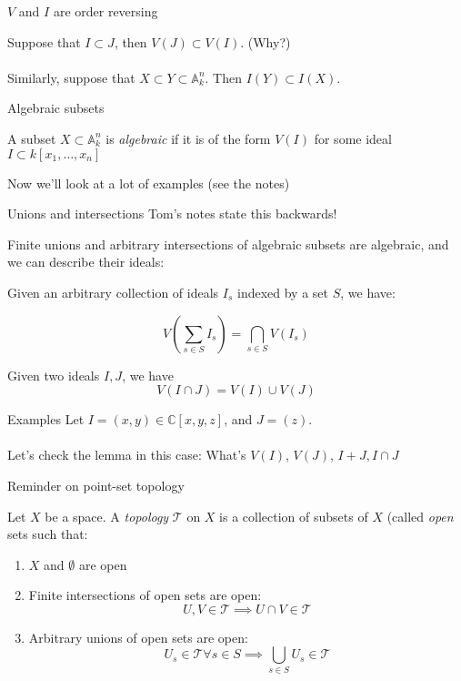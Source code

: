 \documentclass{beamer}
\newcommand{\AAA}{\mathbb{A}}
\newcommand{\C}{\mathbb{C}}
\begin{document}
\begin{frame}{$V$ and $I$ are order reversing}

Suppose that $I\subset J$, then $V(J)\subset V(I)$.  (Why?)
\\~\\
Similarly, suppose that $X\subset Y\subset \AAA_k^n$.  Then $I(Y)\subset I(X)$.


\end{frame}


\begin{frame}{Algebraic subsets}

\begin{definition}
A subset $X\subset \AAA_k^n$ is \emph{algebraic} if it is of the form $V(I)$ for some ideal $I\subset k[x_1,\dots, x_n]$
\end{definition}

Now we'll look at a lot of examples (see the notes)


\end{frame}

\begin{frame}{Unions and intersections}
\alert{Tom's notes state this backwards!}

Finite unions and arbitrary intersections of algebraic subsets are algebraic, and we can describe their ideals:

\begin{lemma}
Given an arbitrary collection of ideals $I_s$ indexed by a set $S$, we have:

$$V\left(\sum_{s\in S} I_s\right)=\bigcap_{s\in S} V(I_s)$$

Given two ideals $I, J$, we have 
$$V(I\cap J)=V(I)\cup V(J)$$
\end{lemma}

\end{frame}

\begin{frame}{Examples}
Let $I=(x,y)\in\C[x,y,z]$, and $J=(z)$.  
\\~\\
Let's check the lemma in this case:
What's $V(I)$, $V(J)$, $I+J, I\cap J$


\end{frame}

\begin{frame}{Reminder on point-set topology}

\begin{definition}
Let $X$ be a space.  A \emph{topology} $\mathcal{T}$ on $X$ is a collection of subsets of $X$ (called \emph{open} sets such that:
\begin{enumerate}
\item $X$ and $\emptyset$ are open
\item Finite intersections of open sets are open:
$$U,V\in\mathcal{T}\implies U\cap V\in\mathcal{T}$$
\item Arbitrary unions of open sets are open:
$$U_s\in\mathcal{T}\forall s\in S\implies \bigcup_{s\in S} U_s\in\mathcal{T}$$
\end{enumerate}


\end{definition}

\end{frame}
\end{document}
